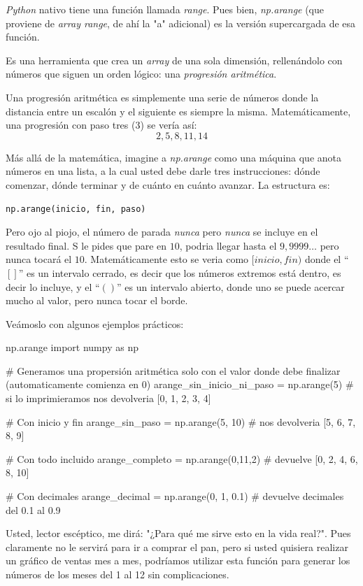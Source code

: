 \textit{Python} nativo tiene una función llamada \textit{range}. Pues bien, \textit{np.arange} (que proviene de \textit{array range}, de ahí la "a" adicional) es la versión supercargada de esa función.

Es una herramienta que crea un \textit{array} de una sola dimensión, rellenándolo con números que siguen un orden lógico: una \textit{progresión aritmética}.

Una progresión aritmética es simplemente una serie de números donde la distancia entre un escalón y el siguiente es siempre la misma. Matemáticamente, una progresión con paso tres (3) se vería así:
\[
2,5,8,11,14
\]

Más allá de la matemática, imagine a \textit{np.arange} como una máquina que anota números en una lista, a la cual usted debe darle tres instrucciones: dónde comenzar, dónde terminar y de cuánto en cuánto avanzar. La estructura es:

\begin{verbatim}
np.arange(inicio, fin, paso)
\end{verbatim}

Pero ojo al piojo, el número de parada \textit{nunca} pero \textit{nunca} se incluye en el resultado final. S le pides que pare en \(10\), podria llegar hasta el \(9,9999\dots\) pero nunca tocará el \(10\). Matemáticamente esto se veria como \([inicio,fin)\) donde el ``\([]\)'' es un intervalo cerrado, es decir que los números extremos está dentro, es decir lo incluye, y el ``\(()\)'' es un intervalo abierto, donde uno se puede acercar mucho al valor, pero nunca tocar el borde.

Veámoslo con algunos ejemplos prácticos:
\begin{pycode}{np.arange}
import numpy as np

# Generamos una propersión aritmética solo con el valor donde debe finalizar (automaticamente comienza en 0)
arange_sin_inicio_ni_paso = np.arange(5) # si lo imprimieramos nos devolveria [0, 1, 2, 3, 4]

# Con inicio y fin
arange_sin_paso = np.arange(5, 10) # nos devolveria [5, 6, 7, 8, 9]

# Con todo incluido
arange_completo = np.arange(0,11,2) # devuelve [0, 2, 4, 6, 8, 10]

# Con decimales
arange_decimal = np.arange(0, 1, 0.1) # devuelve decimales del 0.1 al 0.9

\end{pycode}

Usted, lector escéptico, me dirá: "¿Para qué me sirve esto en la vida real?". Pues claramente no le servirá para ir a comprar el pan, pero si usted quisiera realizar un gráfico de ventas mes a mes, podríamos utilizar esta función para generar los números de los meses del 1 al 12 sin complicaciones.

